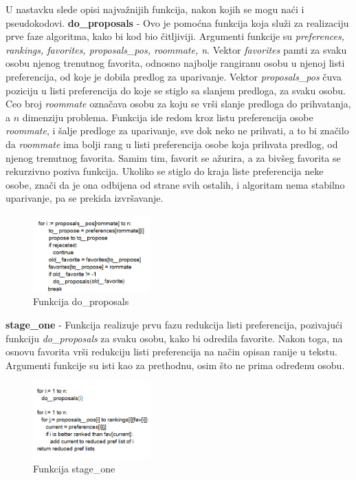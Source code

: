 \documentclass[a4paper]{article}
\begin{document}
U nastavku slede opisi najvažnijih funkcija, nakon kojih se mogu naći i pseudokodovi.
\newline
\textbf{do\_proposals} - Ovo je pomoćna funkcija koja služi za realizaciju prve faze algoritma, kako bi kod bio čitljiviji. Argumenti funkcije su \textit{preferences, rankings, favorites, proposals\_pos, roommate, n}. Vektor \textit{favorites} pamti za svaku osobu njenog trenutnog favorita, odnosno najbolje rangiranu osobu u njenoj listi preferencija, od koje je dobila predlog za uparivanje. Vektor \textit{proposals\_pos} čuva poziciju u listi preferencija do koje se stiglo sa slanjem predloga, za svaku osobu. Ceo broj \textit{roommate} označava osobu za koju se vrši slanje predloga do prihvatanja, a $n$ dimenziju problema. Funkcija ide redom kroz listu preferencija osobe \textit{roommate}, i šalje predloge za uparivanje, sve dok neko ne prihvati, a to bi značilo da \textit{roommate} ima bolji rang u listi preferencija osobe koja prihvata predlog, od njenog trenutnog favorita. Samim tim, favorit se ažurira, a za bivšeg favorita se rekurzivno poziva funkcija. Ukoliko se stiglo do kraja liste preferencija neke osobe, znači da je ona odbijena od strane svih ostalih, i algoritam nema stabilno uparivanje, pa se prekida izvršavanje.

\begin{figure}[H]
    \centering
    \includegraphics[width=0.4\textwidth]{do_proposals.png}
    \caption{Funkcija do\_proposals}
    \label{doprop}
\end{figure}

\textbf{stage\_one} - Funkcija realizuje prvu fazu redukcija listi preferencija, pozivajući funkciju \textit{do\_proposals} za svaku osobu, kako bi odredila favorite. Nakon toga, na osnovu favorita vrši redukciju listi preferencija na način opisan ranije u tekstu. Argumenti funkcije su isti kao za prethodnu, osim što ne prima određenu osobu.

\begin{figure}[H]
    \centering
    \includegraphics[width=0.4\textwidth]{stage one.png}
    \caption{Funkcija stage\_one}
    \label{so}
\end{figure}
\end{document}

